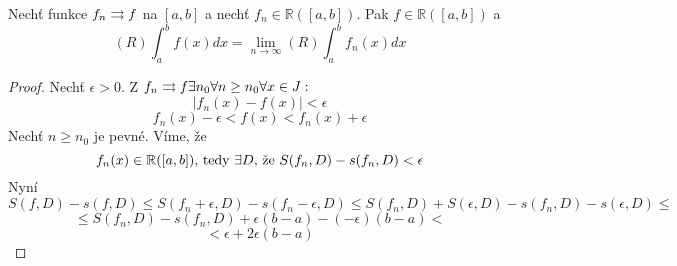 \begin{vetal}
Nechť funkce $f_n \rightrightarrows f$ na $[a,b]$ a nechť $f_n \in \mathbb{R} ([a,b])$. Pak $f \in \mathbb{R}([a,b])$ a 
$$(R) \int_a^b f(x) dx = \lim_{n \rightarrow \infty} (R) \int_a^b f_n(x) dx$$
\end{vetal}
\begin{proof}
Nechť $\epsilon > 0$. Z $f_n \rightrightarrows f \exists n_0 \forall n \geq n_0 \forall x \in J:$
$$|f_n(x) - f(x)| < \epsilon$$
$$f_n(x) - \epsilon < f(x) < f_n(x) + \epsilon$$
Nechť $n \geq n_0$ je pevné. Víme, že 
$$\hbox{$f_n(x) \in \mathbb{R}([a,b])$, tedy $\exists D$, že $S(f_n,D) - s(f_n,D)<\epsilon$}$$
Nyní
$$S(f,D) - s(f,D) \leq S(f_n+\epsilon, D) - s(f_n-\epsilon,D) \leq S(f_n,D)+S(\epsilon,D) - s(f_n,D) - s(\epsilon,D) \leq $$ 
$$ \leq S(f_n,D) - s(f_n,D) +\epsilon(b-a) - (-\epsilon)(b-a) <$$
$$< \epsilon +2\epsilon(b-a)$$
\end{proof}

